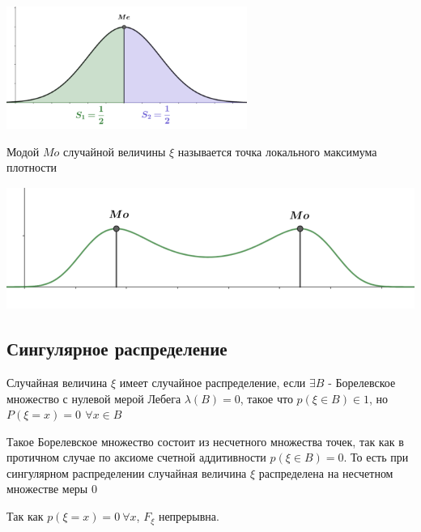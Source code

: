\documentclass[12pt]{article}
\begin{document}
    \includegraphics[height=4cm]{probtheory/images/probtheory_2024_10_22_5}

    \Def Модой $Mo$ случайной величины $\xi$ называется точка локального максимума плотности

    \includegraphics[height=4cm]{probtheory/images/probtheory_2024_10_22_6}

    \subsection{Сингулярное распределение}

    \Def Случайная величина $\xi$ имеет случайное распределение, если $\exists B$ - Борелевское множество с нулевой мерой Лебега $\lambda(B) = 0$, такое что $p(\xi \in B) \in 1$, но $P(\xi = x) = 0 \ \, \forall x \in B$

    \Nota Такое Борелевское множество состоит из несчетного множества точек, так как в протичном случае по аксиоме счетной аддитивности $p(\xi \in B) = 0$. То есть 
    при сингулярном распределении случайная величина $\xi$ распределена на несчетном множестве меры 0

    \Notas Так как $p(\xi = x) = 0 \  \forall x$, $F_\xi$ непрерывна.

    \smallvspace
    
\end{document}
